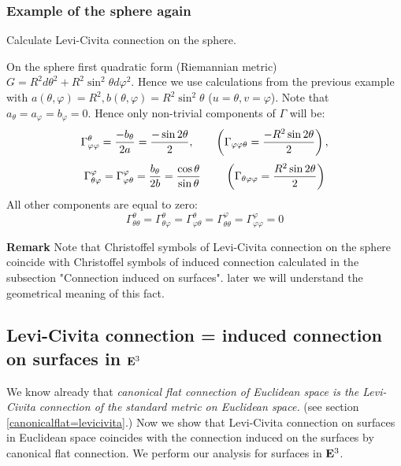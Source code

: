\documentclass[12pt]{article}
\theoremstyle{theorem}
\numberwithin{equation}{section}
\begin{document}
\medskip


\subsubsection {Example of the sphere again}

 {Calculate Levi-Civita connection on the sphere.

 On the sphere first quadratic form (Riemannian metric)
 $G=R^2d\theta^2+R^2\sin^2\theta d\varphi^2$.  Hence we
 use calculations from the previous example
 with $a(\theta,\varphi)=R^2, b(\theta,\varphi)=R^2\sin^2 \theta$
  ($u=\theta, v=\varphi$).
 Note that $a_\theta=a_\varphi=b_\varphi=0$.
  Hence only non-trivial components
 of $\Gamma$ will be:
\begin{equation}\label{Christoffelforsphere:}
  \Gamma^{\theta}_{\varphi\varphi}={-b_\theta\over 2a}={-\sin 2\theta\over 2},
  \qquad
  \left(\Gamma_{\varphi\varphi\theta}={-R^2\sin 2\theta\over 2}\right),
       \end{equation}
  \begin{equation}\label{connectionforsphere}
  \Gamma^{\varphi}_{\theta\varphi}=\Gamma^{\varphi}_{\varphi\theta}=
  {b_\theta\over 2b}={\cos\theta \over \sin\theta}\,
  \qquad
  \left(\Gamma_{\theta\varphi\varphi}={R^2\sin 2\theta\over 2}\right)
\end{equation}
All other components are equal to zero:
                 $$
  \Gamma^{\theta}_{\theta\theta}=\Gamma^{\theta}_{\theta\varphi}=\Gamma^{\theta}_{\varphi\theta}=
  \Gamma^{\varphi}_{\theta\theta}=\Gamma^{\varphi}_{\varphi\varphi}=0
             $$

{\bf Remark} Note that Christoffel symbols of Levi-Civita connection on the sphere coincide
with  Christoffel symbols of induced connection calculated
in the subsection "Connection induced on surfaces".
later we will understand the geometrical meaning of this fact.


\subsection {Levi-Civita connection = induced connection on surfaces in ${\bf E}^3$}




We know already that
{\it canonical flat connection of Euclidean space is the Levi-Civita connection
of the standard metric on Euclidean space.}
(see section \ref{canonicalflat=levicivita}.)
Now we show that Levi-Civita connection on surfaces in Euclidean space coincides with
 the connection induced on the surfaces by canonical flat connection.
We perform our analysis for surfaces in ${\bf E}^3$.

}
\end{document}
